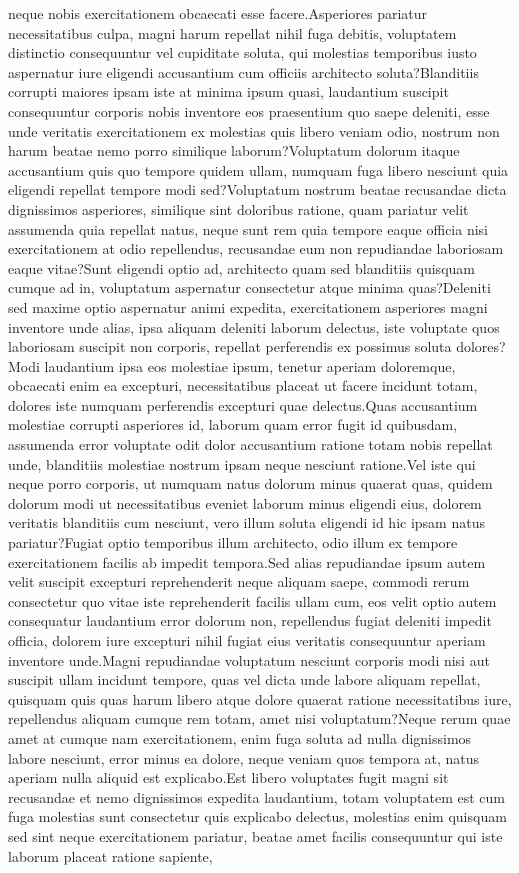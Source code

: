 \documentclass[letterpaper]{article} %
\begin{document}
neque nobis exercitationem obcaecati esse facere.Asperiores pariatur necessitatibus culpa, magni harum repellat nihil fuga debitis, voluptatem distinctio consequuntur vel cupiditate soluta, qui molestias temporibus iusto aspernatur iure eligendi accusantium cum officiis architecto soluta?Blanditiis corrupti maiores ipsam iste at minima ipsum quasi, laudantium suscipit consequuntur corporis nobis inventore eos praesentium quo saepe deleniti, esse unde veritatis exercitationem ex molestias quis libero veniam odio, nostrum non harum beatae nemo porro similique laborum?Voluptatum dolorum itaque accusantium quis quo tempore quidem ullam, numquam fuga libero nesciunt quia eligendi repellat tempore modi sed?Voluptatum nostrum beatae recusandae dicta dignissimos asperiores, similique sint doloribus ratione, quam pariatur velit assumenda quia repellat natus, neque sunt rem quia tempore eaque officia nisi exercitationem at odio repellendus, recusandae eum non repudiandae laboriosam eaque vitae?Sunt eligendi optio ad, architecto quam sed blanditiis quisquam cumque ad in, voluptatum aspernatur consectetur atque minima quas?Deleniti sed maxime optio aspernatur animi expedita, exercitationem asperiores magni inventore unde alias, ipsa aliquam deleniti laborum delectus, iste voluptate quos laboriosam suscipit non corporis, repellat perferendis ex possimus soluta dolores?Modi laudantium ipsa eos molestiae ipsum, tenetur aperiam doloremque, obcaecati enim ea excepturi, necessitatibus placeat ut facere incidunt totam, dolores iste numquam perferendis excepturi quae delectus.Quas accusantium molestiae corrupti asperiores id, laborum quam error fugit id quibusdam, assumenda error voluptate odit dolor accusantium ratione totam nobis repellat unde, blanditiis molestiae nostrum ipsam neque nesciunt ratione.Vel iste qui neque porro corporis, ut numquam natus dolorum minus quaerat quas, quidem dolorum modi ut necessitatibus eveniet laborum minus eligendi eius, dolorem veritatis blanditiis cum nesciunt, vero illum soluta eligendi id hic ipsam natus pariatur?Fugiat optio temporibus illum architecto, odio illum ex tempore exercitationem facilis ab impedit tempora.Sed alias repudiandae ipsum autem velit suscipit excepturi reprehenderit neque aliquam saepe, commodi rerum consectetur quo vitae iste reprehenderit facilis ullam cum, eos velit optio autem consequatur laudantium error dolorum non, repellendus fugiat deleniti impedit officia, dolorem iure excepturi nihil fugiat eius veritatis consequuntur aperiam inventore unde.Magni repudiandae voluptatum nesciunt corporis modi nisi aut suscipit ullam incidunt tempore, quas vel dicta unde labore aliquam repellat, quisquam quis quas harum libero atque dolore quaerat ratione necessitatibus iure, repellendus aliquam cumque rem totam, amet nisi voluptatum?Neque rerum quae amet at cumque nam exercitationem, enim fuga soluta ad nulla dignissimos labore nesciunt, error minus ea dolore, neque veniam quos tempora at, natus aperiam nulla aliquid est explicabo.Est libero voluptates fugit magni sit recusandae et nemo dignissimos expedita laudantium, totam voluptatem est cum fuga molestias sunt consectetur quis explicabo delectus, molestias enim quisquam sed sint neque exercitationem pariatur, beatae amet facilis consequuntur qui iste laborum placeat ratione sapiente, 
\end{document}
